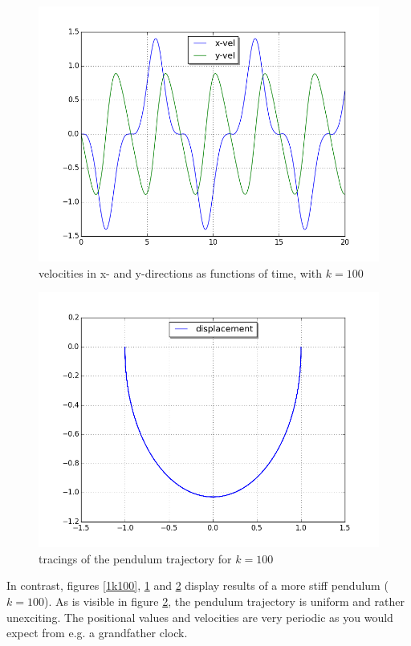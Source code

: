 \documentclass[a4paper,11pt]{article}
\theoremstyle{mytheor}
\begin{document}
\begin{figure}[!h]
\centering
\includegraphics[scale=0.5]{task1_k100_2.png}
\caption{velocities in x- and y-directions as functions of time, with $k = 100$}
\label{2k100}
\end{figure}

\begin{figure}[!h]
\centering
\includegraphics[scale=0.5]{task1_k100_3.png}
\caption{tracings of the pendulum trajectory for $k = 100$}
\label{3k100}
\end{figure}

In contrast, figures \ref{1k100}, \ref{2k100} and \ref{3k100} display results of a more stiff pendulum ($k = 100$). As is visible in figure \ref{3k100}, the pendulum trajectory is uniform and rather unexciting. The positional values and velocities are very periodic as you would expect from e.g. a grandfather clock.
\end{document}
